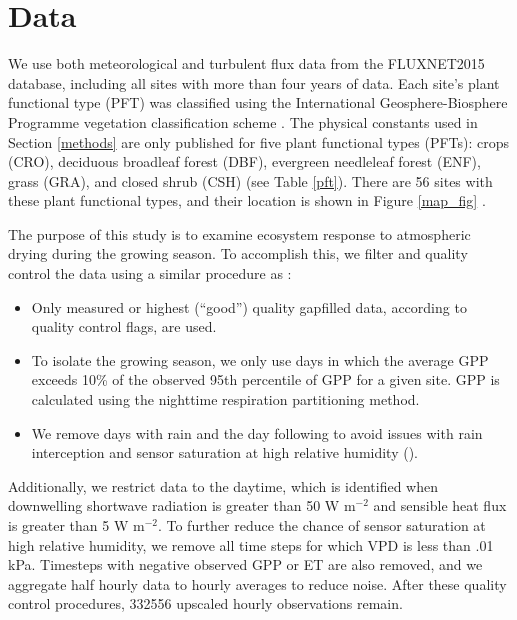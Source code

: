 \documentclass[draft,linenumbers]{agujournal}
\begin{document}
\section{Data}
\label{data}
We use both meteorological and turbulent flux data from the FLUXNET2015 database, including all sites with more than four years of data. Each site's plant functional type (PFT) was classified using the International Geosphere-Biosphere Programme vegetation classification scheme \citep{Loveland_1999}. The physical constants used in Section \ref{methods} are only published for five plant functional types (PFTs): crops (CRO), deciduous broadleaf forest (DBF), evergreen needleleaf forest (ENF), grass (GRA), and closed shrub (CSH) (see Table \ref{pft}). There are 56 sites with these plant functional types, and their location is shown in  Figure \ref{map_fig} .

The purpose of this study is to examine ecosystem response to atmospheric drying during the growing season. To accomplish this, we filter and quality control the data using a similar procedure as \cite{Zhou_2015}:
\begin{itemize}
\item Only measured or highest (``good'') quality gapfilled data, according to quality control flags, are used.
\item To isolate the growing season, we only use days in which the average GPP exceeds 10\% of the observed 95th percentile of GPP for a given site. GPP is calculated using the nighttime respiration partitioning method.
\item We remove days with rain and the day following to avoid issues with rain interception and sensor saturation at high relative humidity (\cite{MEDLYN_2011}).
\end{itemize}
Additionally, we restrict data to the daytime, which is identified when downwelling shortwave radiation is greater than 50 W m$^{-2}$ and sensible heat flux is greater than 5 W m$^{-2}$. To further reduce the chance of sensor saturation at high relative humidity, we remove all time steps for which VPD is less than .01 kPa. Timesteps with negative observed GPP or ET are also removed, and we aggregate half hourly data to hourly averages to reduce noise. After these quality control procedures, 332556 upscaled hourly observations remain. 
\end{document}
